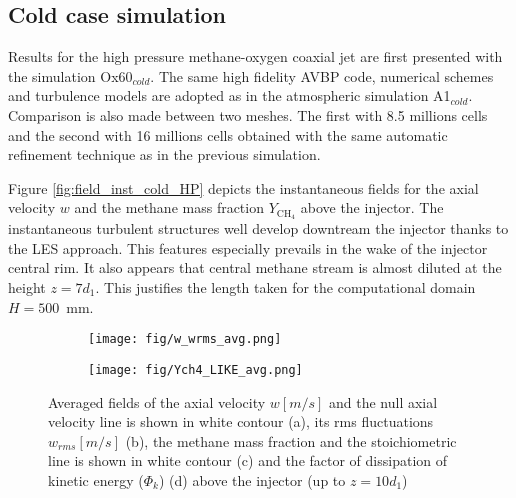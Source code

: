 \documentclass[twocolumn,10pt]{asme2e}
\begin{document}
\subsection*{Cold case simulation}


Results for the high pressure methane-oxygen coaxial jet are first presented with the simulation Ox60$_{cold}$. The same high fidelity AVBP code, numerical schemes and turbulence models are adopted as in the atmospheric simulation A1$_{cold}$. Comparison is also made between two meshes. The first with 8.5 millions cells and the second with 16 millions cells obtained with the same automatic refinement technique as in the previous simulation.

Figure \ref{fig:field_inst_cold_HP} depicts the instantaneous fields for the axial velocity $w$ and the methane mass fraction $Y_{\mathrm{CH}_4}$ above the injector. The instantaneous turbulent structures well develop downtream the injector thanks to the LES approach. This features especially prevails in the wake of the injector central rim. It also appears that central methane stream is almost diluted at the height $z=7 d_1$. This justifies the length taken for the computational domain $H=500$~mm.
\begin{figure}
   \centering
   \begin{subfigure}[b]{1\linewidth}        %
      \hspace{-5 mm}
       \texttt{[image: fig/w\_wrms\_avg.png]}
   \end{subfigure}
      \begin{subfigure}[b]{1\linewidth}        %
      \centering
       \texttt{[image: fig/Ych4\_LIKE\_avg.png]}
   \end{subfigure}
      \caption{Averaged fields of the axial velocity $w [m/s]$ and the null axial velocity line is shown in white contour (a), its rms fluctuations $w_{rms} [m/s]$ (b), the methane mass fraction and the stoichiometric line is shown in white contour  (c) and the factor of dissipation of kinetic energy ($\Phi_k$) (d) above the injector (up to $z=10d_1$) }
   \label{fig:field_avg_cold_HP}
\end{figure} 
\end{document}
